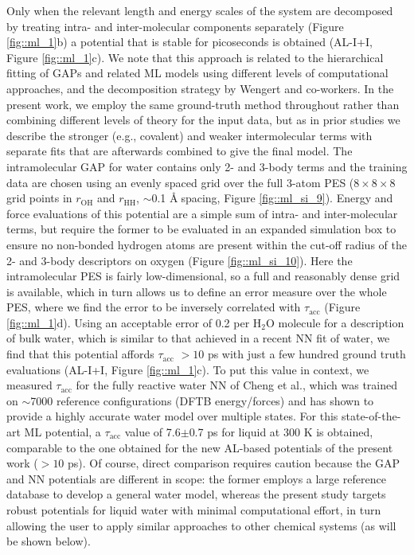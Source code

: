 \documentclass[../../main.tex]{subfiles}
\newcommand{\taua}{$\tau_\text{acc}$ }
\begin{document}
Only when the relevant length and energy scales of the system are decomposed by treating intra- and inter-molecular components separately (Figure \ref{fig::ml_1}b) a potential that is stable for picoseconds is obtained (AL-I+I, Figure \ref{fig::ml_1}c). We note that this approach is related to the hierarchical fitting of GAPs\cite{Veit2019, Bartok2013} and related ML models\cite{Dral2020, Ramakrishnan2015, Schran2020, Sukuba2018} using different levels of computational approaches, and the decomposition strategy by Wengert and co-workers.\cite{Wengert2021} In the present work, we employ the same ground-truth method throughout rather than combining different levels of theory for the input data, but as in prior studies we describe the stronger (e.g., covalent) and weaker intermolecular terms with separate fits that are afterwards combined to give the final model. The intramolecular GAP for water contains only 2- and 3-body terms and the training data are chosen using an evenly spaced grid over the full 3-atom PES ($8\times8\times8$ grid points in $r_\text{OH}$ and $r_\text{HH}$, $\sim$0.1 \AA$\;$spacing, Figure \ref{fig::ml_si_9}). Energy and force evaluations of this potential are a simple sum of intra- and inter-molecular terms, but require the former to be evaluated in an expanded simulation box to ensure no non-bonded hydrogen atoms are present within the cut-off radius of the 2- and 3-body descriptors on oxygen (Figure \ref{fig::ml_si_10}). Here the intramolecular PES is fairly low-dimensional, so a full and reasonably dense grid is available, which in turn allows us to define an error measure over the whole PES, where we find the error to be inversely correlated with \taua (Figure \ref{fig::ml_1}d). Using an acceptable error of 0.2 \kcalx per H${}_2$O molecule for a description of bulk water, which is similar to that achieved in a recent NN fit of water,\cite{Cheng2019} we find that this potential affords \taua $>10$ ps with just a few hundred ground truth evaluations (AL-I+I, Figure \ref{fig::ml_1}c). To put this value in context, we measured \taua for the fully reactive water NN of Cheng et al.,\cite{Cheng2019} which was trained on $\sim$7000 reference configurations (DFTB energy/forces) and has shown to provide a highly accurate water model over multiple states. For this state-of-the-art ML potential, a \taua value of 7.6$\pm$0.7 ps for liquid at 300 K is obtained, comparable to the one obtained for the new AL-based potentials of the present work ($>10$ ps). Of course, direct comparison requires caution because the GAP and NN potentials are different in scope: the former employs a large reference database to develop a general water model, whereas the present study targets robust potentials for liquid water with minimal computational effort, in turn allowing the user to apply similar approaches to other chemical systems (as will be shown below). 
\end{document}
